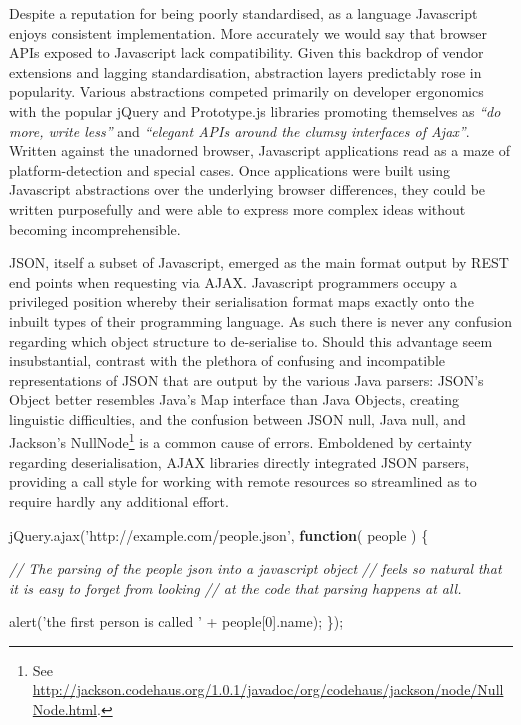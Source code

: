 \documentclass[]{article}
\newenvironment{Shaded}{}{}
\newcommand{\KeywordTok}[1]{\textcolor[rgb]{0.00,0.44,0.13}{\textbf{{#1}}}}
\newcommand{\DecValTok}[1]{\textcolor[rgb]{0.25,0.63,0.44}{{#1}}}
\newcommand{\StringTok}[1]{\textcolor[rgb]{0.25,0.44,0.63}{{#1}}}
\newcommand{\CommentTok}[1]{\textcolor[rgb]{0.38,0.63,0.69}{\textit{{#1}}}}
\newcommand{\OtherTok}[1]{\textcolor[rgb]{0.00,0.44,0.13}{{#1}}}
\newcommand{\FunctionTok}[1]{\textcolor[rgb]{0.02,0.16,0.49}{{#1}}}
\newcommand{\NormalTok}[1]{{#1}}
\begin{document}
Despite a reputation for being poorly standardised, as a language
Javascript enjoys consistent implementation. More accurately we would
say that browser APIs exposed to Javascript lack compatibility. Given
this backdrop of vendor extensions and lagging standardisation,
abstraction layers predictably rose in popularity. Various abstractions
competed primarily on developer ergonomics with the popular jQuery and
Prototype.js libraries promoting themselves as \emph{``do more, write
less''} and \emph{``elegant APIs around the clumsy interfaces of
Ajax''}. Written against the unadorned browser, Javascript applications
read as a maze of platform-detection and special cases. Once
applications were built using Javascript abstractions over the
underlying browser differences, they could be written purposefully and
were able to express more complex ideas without becoming
incomprehensible.

JSON, itself a subset of Javascript, emerged as the main format output
by REST end points when requesting via AJAX. Javascript programmers
occupy a privileged position whereby their serialisation format maps
exactly onto the inbuilt types of their programming language. As such
there is never any confusion regarding which object structure to
de-serialise to. Should this advantage seem insubstantial, contrast with
the plethora of confusing and incompatible representations of JSON that
are output by the various Java parsers: JSON's Object better resembles
Java's Map interface than Java Objects, creating linguistic
difficulties, and the confusion between JSON null, Java null, and
Jackson's NullNode\footnote{See
  \url{http://jackson.codehaus.org/1.0.1/javadoc/org/codehaus/jackson/node/NullNode.html}.}
is a common cause of errors. Emboldened by certainty regarding
deserialisation, AJAX libraries directly integrated JSON parsers,
providing a call style for working with remote resources so streamlined
as to require hardly any additional effort.

\begin{Shaded}
\begin{Highlighting}[]
\OtherTok{jQuery}\NormalTok{.}\FunctionTok{ajax}\NormalTok{(}\StringTok{'http://example.com/people.json'}\NormalTok{, }\KeywordTok{function}\NormalTok{( people ) \{}

   \CommentTok{// The parsing of the people json into a javascript object}
   \CommentTok{// feels so natural that it is easy to forget from looking }
   \CommentTok{// at the code that parsing happens at all. }
   
   \FunctionTok{alert}\NormalTok{(}\StringTok{'the first person is called '} \NormalTok{+ people[}\DecValTok{0}\NormalTok{].}\FunctionTok{name}\NormalTok{);}
\NormalTok{\});}
\end{Highlighting}
\end{Shaded}
\end{document}

